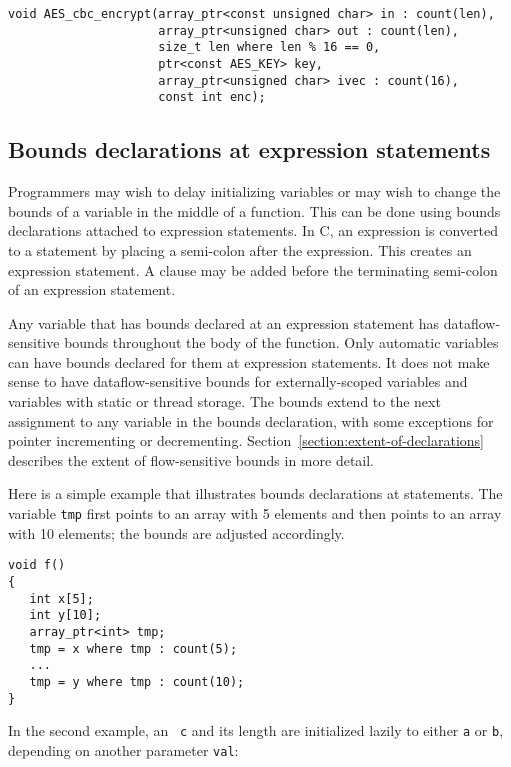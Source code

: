 \begin{verbatim}
void AES_cbc_encrypt(array_ptr<const unsigned char> in : count(len),
                     array_ptr<unsigned char> out : count(len),
                     size_t len where len % 16 == 0,
                     ptr<const AES_KEY> key,
                     array_ptr<unsigned char> ivec : count(16),
                     const int enc);
\end{verbatim}

\subsection{Bounds declarations at expression statements}
\label{section:statement-declarations}

Programmers may wish to delay initializing variables or may wish to
change the bounds of a variable in the middle of a function. This can be
done using bounds declarations attached to expression statements. In C,
an expression is converted to a statement by placing a semi-colon after
the expression. This creates an expression statement. A 
clause may be added before the terminating semi-colon of an expression
statement.

Any variable that has bounds declared at an expression statement has
dataflow-sensitive bounds throughout the body of the function. Only
automatic variables can have bounds declared for them at expression
statements. It does not make sense to have dataflow-sensitive bounds for
externally-scoped variables and variables with static or thread storage.
The bounds extend to the next assignment to any variable in the bounds
declaration, with some exceptions for pointer incrementing or
decrementing. Section~\ref{section:extent-of-declarations} 
describes the extent of flow-sensitive bounds
in more detail.

Here is a simple example that illustrates bounds declarations at
statements. The variable \texttt{tmp} first points to an array with 5
elements and then points to an array with 10 elements; the bounds are
adjusted accordingly.

\begin{verbatim}
void f() 
{
   int x[5];
   int y[10];
   array_ptr<int> tmp;
   tmp = x where tmp : count(5);
   ...
   tmp = y where tmp : count(10);
}
\end{verbatim}

In the second example, an \arrayptr\ \texttt{c} and its length are initialized
lazily to either \texttt{a} or \texttt{b}, depending on another parameter \texttt{val}:

